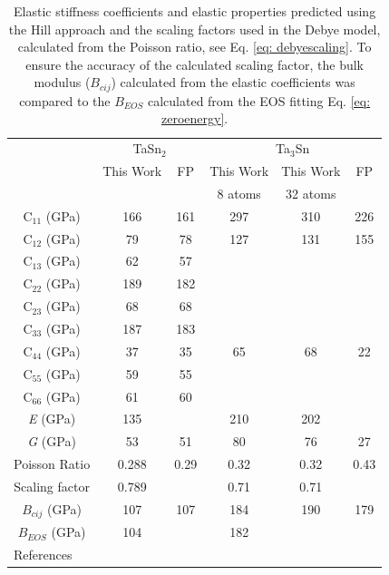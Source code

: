 \newpage
\begin{table}[H]
	\caption{Elastic stiffness coefficients and elastic properties predicted using the Hill approach and the scaling factors used in the Debye model, calculated from the Poisson ratio, see Eq. \ref{eq: debyescaling}. To ensure the accuracy of the calculated scaling factor, the bulk modulus ($B_{cij}$) calculated from the elastic coefficients was compared to the $B_{EOS}$ calculated from the EOS fitting Eq. \ref{eq: zeroenergy}.}
	\centering
	\begin{tabular}{ c c c c c c }
		\hline
		  & \multicolumn{2}{c}{TaSn$_2$} & \multicolumn{3}{c}{Ta$_3$Sn}\\
		  & This Work & FP & This Work & This Work  & FP\\
		  & &  & 8 atoms & 32 atoms & \\
		  \hline
		  C$_{11}$ (GPa) & 166 & 161 & 297 & 310 & 226\\
		  C$_{12}$ (GPa) & 79 & 78 & 127 & 131 & 155\\
		  C$_{13}$ (GPa) & 62 & 57 & & & \\
		  C$_{22}$ (GPa) & 189 & 182 & & & \\
		  C$_{23}$ (GPa) & 68 & 68 & & & \\
		  C$_{33}$ (GPa) & 187 & 183 & & & \\
		  C$_{44}$ (GPa) & 37 & 35 & 65 & 68 & 22\\
		  C$_{55}$ (GPa) & 59 & 55 & & & \\
		  C$_{66}$ (GPa) & 61 & 60 & & & \\
		  \textit{E} (GPa) & 135 & & 210 & 202 &  \\
		  \textit{G} (GPa) & 53 & 51 & 80 & 76 & 27\\
		  Poisson Ratio & 0.288 & 0.29 & 0.32 & 0.32 & 0.43\\
		  Scaling factor & 0.789 & & 0.71 & 0.71 & \\
		  $B_{cij}$ (GPa) & 107 & 107 & 184 & 190 & 179\\
		  $B_{EOS}$ (GPa) & 104 & & 182 & & \\
		\hline
		\multicolumn{6}{l}{References \cite{Bergerhoff1983,Geller1955_165,Karlsruhe,MaterialsProject,Jouault1967_611}}
	\end{tabular}
	\label{Ch4-table:TaSnelastic}
\end{table}
\clearpage

